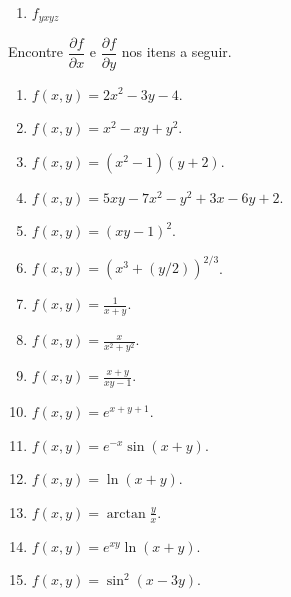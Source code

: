 \documentclass[11pt,a4paper]{article}
\begin{document}
\begin{enumerate}
\begin{enumerate}
			
			
			
			
			
			
			
			
			
			
			
			
			
			\item $f_{yxyz}$
			
		\end{enumerate}
		
		
		 Encontre $\dfrac{\partial f}{\partial x}$ e $\dfrac{\partial f}{\partial y}$ nos itens a seguir.
		
		\begin{enumerate}
			\item $f(x,y) = 2x^2 - 3y - 4$.
			\item $f(x,y) = x^2 - xy + y^2$.
			\item $f(x,y) = (x^2 - 1)(y + 2)$.
			\item $f(x,y) = 5xy - 7x^2 - y^2 + 3x - 6y + 2$.
			\item $f(x,y) = (xy - 1)^2$.
			\item $f(x,y) = (x^3 + (y/2))^{2/3}$.
			\item $f(x,y) = \frac{1}{x + y} $.
			
			
			
			
			
			
			
			
			
			
			
			
			
			
			
			
			
			
			\item $f(x,y) = \frac{x}{x^2 + y^2} $.
			\item $f(x,y) = \frac{x+y}{xy - 1} $.
		\item $f(x,y) = e^{x + y + 1}$.
			\item $f(x,y) = e^{-x} \sin (x+y) $.
		\item $f(x,y) = \ln (x + y)$.
			\item $f(x,y) = \arctan \frac{y}{x}$.
			\item $f(x,y) = e^{xy} \ln (x + y)$.
			\item $f(x,y) = \sin^2 (x - 3y)$.
			
			
			
			
			
			
			
			
			
			
			
			
			

\end{enumerate}
\end{enumerate}
\end{document}
